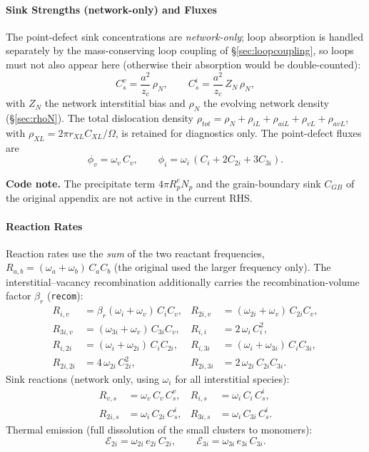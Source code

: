 \documentclass{article}
\begin{document}
\paragraph{Sink Strengths (network-only) and Fluxes}
The point-defect sink concentrations are \emph{network-only}; loop absorption is
handled separately by the mass-conserving loop coupling of
\S\ref{sec:loopcoupling}, so loops must not also appear here (otherwise their
absorption would be double-counted):
\begin{equation}
C_s^v=\frac{a^2}{z_c}\,\rho_N,\qquad
C_s^i=\frac{a^2}{z_c}\,Z_N\,\rho_N,
\label{eq:sinks}
\end{equation}
with $Z_N$ the network interstitial bias and $\rho_N$ the evolving network
density (\S\ref{sec:rhoN}). The total dislocation density
$\rho_{tot}=\rho_N+\rho_{iL}+\rho_{aiL}+\rho_{vL}+\rho_{avL}$, with
$\rho_{XL}=2\pi r_{XL}C_{XL}/\Omega$, is retained for diagnostics only. The
point-defect fluxes are
\begin{equation}
\phi_v=\omega_v\,C_v,\qquad
\phi_i=\omega_i\,(C_i+2C_{2i}+3C_{3i}).
\label{eq:flux}
\end{equation}

\par\medskip\noindent%
\textbf{Code note.} The precipitate term $4\pi R_p^e N_p$ and the grain-boundary
sink $C_{GB}$ of the original appendix are not active in the current RHS.\par\medskip

\paragraph{Reaction Rates}
Reaction rates use the \emph{sum} of the two reactant frequencies,
$R_{a,b}=(\omega_a+\omega_b)\,C_aC_b$ (the original used the larger frequency
only). The interstitial--vacancy recombination additionally carries the
recombination-volume factor $\beta_r$ (\texttt{recom}):
\begin{align}
R_{i,v}   &= \beta_r(\omega_i+\omega_v)\,C_iC_v, &
R_{2i,v}  &= (\omega_{2i}+\omega_v)\,C_{2i}C_v, \\
R_{3i,v}  &= (\omega_{3i}+\omega_v)\,C_{3i}C_v, &
R_{i,i}   &= 2\,\omega_i\,C_i^2, \\
R_{i,2i}  &= (\omega_i+\omega_{2i})\,C_iC_{2i}, &
R_{i,3i}  &= (\omega_i+\omega_{3i})\,C_iC_{3i}, \\
R_{2i,2i} &= 4\,\omega_{2i}\,C_{2i}^2, &
R_{2i,3i} &= 2\,\omega_{2i}\,C_{2i}C_{3i}.
\end{align}
Sink reactions (network only, using $\omega_i$ for all interstitial species):
\begin{align}
R_{v,s}  &= \omega_v\,C_v\,C_s^v, &
R_{i,s}  &= \omega_i\,C_i\,C_s^i, \\
R_{2i,s} &= \omega_i\,C_{2i}\,C_s^i, &
R_{3i,s} &= \omega_i\,C_{3i}\,C_s^i.
\end{align}
Thermal emission (full dissolution of the small clusters to monomers):
\begin{equation}
\mathcal{E}_{2i}=\omega_{2i}\,e_{2i}\,C_{2i},\qquad
\mathcal{E}_{3i}=\omega_{3i}\,e_{3i}\,C_{3i}.
\end{equation}
\end{document}
